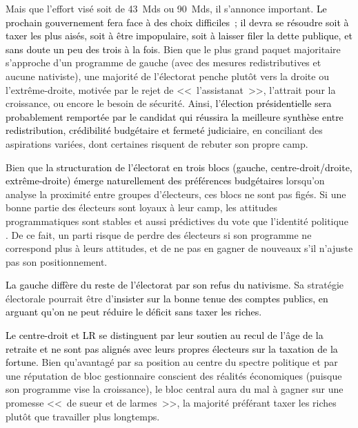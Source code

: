 \documentclass[12pt,french]{article}
\newcommand{\blue}[1]{\textcolor{black}{#1}} %
\begin{document}

Mais que l'effort visé soit de 43~Mds ou 90~Mds, il s'annonce important. \blue{Le prochain gouvernement fera face à des choix difficiles~; il devra se résoudre soit à taxer les plus aisés, soit à être impopulaire, soit à laisser filer la dette publique, et sans doute un peu des trois à la fois}. 
Bien que le plus grand paquet majoritaire s'approche d'un programme de gauche (avec des mesures redistributives et aucune nativiste), une majorité de l'électorat penche plutôt vers la droite ou l'extrême-droite, motivée par le rejet de <<~l'assistanat~>>, l'attrait pour la croissance, ou encore le besoin de sécurité. 
Ainsi, \blue{l'élection présidentielle sera probablement remportée par le candidat qui réussira la meilleure synthèse entre redistribution, crédibilité budgétaire et fermeté judiciaire}, en conciliant des aspirations variées, dont certaines risquent de rebuter son propre camp.  

Bien que \blue{la structuration de l'électorat en trois blocs (gauche, centre-droit/droite, extrême-droite) émerge naturellement des préférences budgétaires} lorsqu'on analyse la proximité entre groupes d'électeurs, ces blocs ne sont pas figés. Si une bonne partie des électeurs sont loyaux à leur camp, les attitudes programmatiques sont stables et aussi prédictives du vote que l'identité politique \citep{ansolabehere_strength_2008}. De ce fait, un parti risque de perdre des électeurs %
si son programme ne correspond plus à leurs attitudes, et de ne pas en gagner de nouveaux s'il n'ajuste pas son positionnement. 

\blue{La gauche diffère du reste de l'électorat par son refus du nativisme.} %
Sa stratégie électorale pourrait être d'\blue{insister sur la bonne tenue des comptes publics, en arguant %
qu'on ne peut réduire le déficit sans taxer les riches}. 

\blue{Le centre-droit et LR se distinguent par leur soutien au recul de l'âge de la retraite et ne sont pas alignés avec leurs propres électeurs sur la taxation de la fortune}. Bien qu'avantagé par sa position au centre du spectre politique et par une réputation de bloc gestionnaire conscient des réalités économiques (puisque son programme vise la croissance), le bloc central aura du mal à gagner sur une promesse <<~de sueur et de larmes~>>, %
la majorité préférant taxer les riches plutôt que travailler plus longtemps. %
\end{document}
